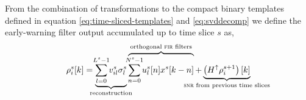 From the combination of transformations to the compact binary templates defined
in equation \eqref{eq:time-sliced-templates} and \eqref{eq:svddecomp} we define
the early-warning filter output accumulated up to time slice $s$ as,
%
%
\begin{equation}
	\rho_i^s [k] =%
		\underbrace{
			\sum_{\mathclap{l=0}}^{\mathclap{L^s-1}} v_{il}^s \sigma_l^s
		}_\textrm{\clap{reconstruction}}
		\overbrace{
			\sum_{\mathclap{n=0}}^{\mathclap{N^s-1}} u_l^s[n] x^s[k-n]
		}^\textrm{\clap{orthogonal {\sc fir} filters}}
		+
		\underbrace{
			\left(H^\uparrow \rho_i^{s+1}\right)[k]
		}_\textrm{\clap{{\sc snr} from previous time slices}}
\end{equation}
%
%
%
%
